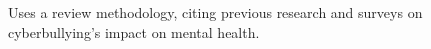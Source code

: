 Uses a review methodology, citing previous research and surveys on cyberbullying's impact on mental health.